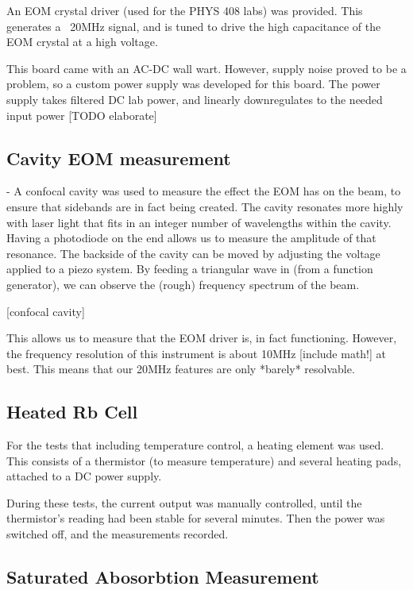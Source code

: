 An EOM crystal driver (used for the PHYS 408 labs) was provided.  This generates a ~20MHz signal, and is tuned to drive the high capacitance of the EOM crystal at a high voltage.

This board came with an AC-DC wall wart.  However, supply noise proved to be a problem, so a custom power supply was developed for this board.  The power supply takes filtered DC lab power, and linearly downregulates to the needed input power [TODO elaborate]

\subsection{Cavity EOM measurement}

- A confocal cavity was used to measure the effect the EOM has on the beam, to ensure that sidebands are in fact being created.  The cavity resonates more highly with laser light that fits in an integer number of wavelengths within the cavity.  Having a photodiode on the end allows us to measure the amplitude of that resonance.  The backside of the cavity can be moved by adjusting the voltage applied to a piezo system.  By feeding a triangular wave in (from a function generator), we can observe the (rough) frequency spectrum of the beam.

[confocal cavity]

This allows us to measure that the EOM driver is, in fact functioning.  However, the frequency resolution of this instrument is about 10MHz [include math!] at best.  This means that our 20MHz features are only *barely* resolvable.

\subsection{Heated Rb Cell}

For the tests that including temperature control, a heating element was used.  This consists of a thermistor (to measure temperature) and several heating pads, attached to a DC power supply.

During these tests, the current output was manually controlled, until the thermistor's reading had been stable for several minutes.  Then the power was switched off, and the measurements recorded.

\subsection{Saturated Abosorbtion Measurement}

